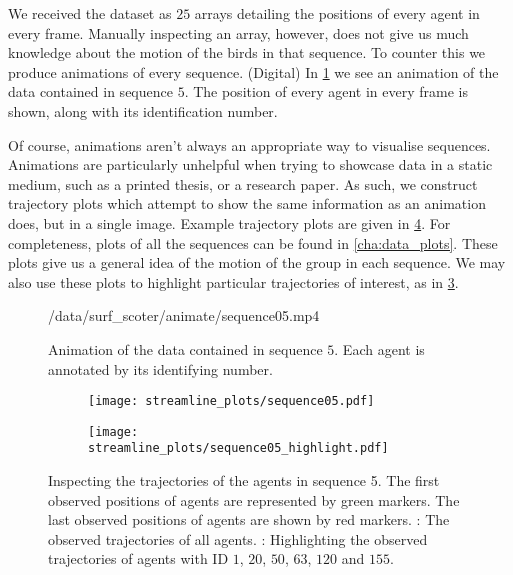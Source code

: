 We received the dataset as $25$ arrays detailing the positions of every agent in every frame. Manually inspecting an array, however, does not give us much knowledge about the motion of the birds in that sequence. To counter this we produce animations of every sequence. (Digital) In \cref{anim:sequence05} we see an animation of the data contained in sequence $5$. The position of every agent in every frame is shown, along with its identification number.

Of course, animations aren't always an appropriate way to visualise sequences. Animations are particularly unhelpful when trying to showcase data in a static medium, such as a printed thesis, or a research paper. As such, we construct trajectory plots which attempt to show the same information as an animation does, but in a single image. Example trajectory plots are given in \cref{fig:seq05_traj}. For completeness, plots of all the sequences can be found in \cref{cha:data_plots}. These plots give us a general idea of the motion of the group in each sequence. We may also use these plots to highlight particular trajectories of interest, as in \cref{subfig:seq05_traj_highlight}. 

\begin{figure}[!tbp]
	\centering
				 {\textwidth}{\textwidth}{/data/surf_scoter/animate/sequence05.mp4}
	\vspace{-190pt}
	\caption{Animation of the data contained in sequence $5$. Each agent is annotated by its identifying number.}
	\label{anim:sequence05}
\end{figure}

\begin{figure}[!tbp]
	\begin{subfigure}[b]{0.5\textwidth}
		\centering
		\texttt{[image: streamline\_plots/sequence05.pdf]}
		\caption{}
		\label{subfig:seq05_traj_no_highlight}
	\end{subfigure}%
	\begin{subfigure}[b]{0.5\textwidth}
		\centering
		\texttt{[image: streamline\_plots/sequence05\_highlight.pdf]}
		\caption{}
		\label{subfig:seq05_traj_highlight}
	\end{subfigure}
	\caption{Inspecting the trajectories of the agents in sequence 5. The first observed positions of agents are represented by green markers. The last observed positions of agents are shown by red markers. : The observed trajectories of all agents. : Highlighting the observed trajectories of agents with ID $1$, $20$, $50$, $63$, $120$ and $155$.}
	\label{fig:seq05_traj}
\end{figure}

